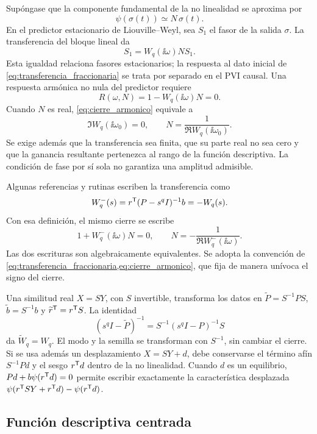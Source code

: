 Supóngase que la componente fundamental de la no linealidad se aproxima por
\[
\psi(\sigma(t))\simeq N\,\sigma(t).
\]
En el predictor estacionario de Liouville--Weyl, sea \(S_1\) el fasor de
la salida \(\sigma\). La transferencia del bloque lineal da
\[
S_1=W_q(\ii\omega)N S_1.
\]
Esta igualdad relaciona fasores estacionarios; la respuesta al dato inicial
de \cref{eq:transferencia_fraccionaria} se trata por separado en el PVI
causal. Una respuesta armónica no nula del predictor requiere
\begin{equation}
R(\omega,N)
=1-W_q(\ii\omega)N=0.
\label{eq:cierre_armonico}
\end{equation}
Cuando \(N\) es real, \cref{eq:cierre_armonico} equivale a
\begin{equation}
\Im W_q(\ii\omega_0)=0,\qquad
N=\frac{1}{\Re W_q(\ii\omega_0)}.
\label{eq:condiciones_fase_ganancia}
\end{equation}
Se exige además que la transferencia sea finita, que su parte real no sea
cero y que la ganancia resultante pertenezca al rango de la función
descriptiva. La condición de fase por sí sola no garantiza una amplitud
admisible.

Algunas referencias y rutinas escriben la transferencia como
\[
W_q^{-}(s)=r^{\mathsf T}(P-s^qI)^{-1}b=-W_q(s).
\]
Con esa definición, el mismo cierre se escribe
\[
1+W_q^{-}(\ii\omega)N=0,\qquad
N=-\frac{1}{\Re W_q^{-}(\ii\omega)}.
\]
Las dos escrituras son algebraicamente equivalentes. Se adopta la convención de
\cref{eq:transferencia_fraccionaria,eq:cierre_armonico}, que fija de manera
unívoca el signo del cierre.

Una similitud real \(X=SY\), con \(S\) invertible, transforma los datos
en \(\widetilde P=S^{-1}PS\), \(\widetilde b=S^{-1}b\) y
\(\widetilde r^{\mathsf T}=r^{\mathsf T}S\). La identidad
\[
 (s^qI-\widetilde P)^{-1}=S^{-1}(s^qI-P)^{-1}S
\]
da \(\widetilde W_q=W_q\). El modo y la semilla se transforman con
\(S^{-1}\), sin cambiar el cierre. Si se usa además un desplazamiento
\(X=SY+d\), debe conservarse el término afín \(S^{-1}Pd\) y el
sesgo \(r^{\mathsf T}d\) dentro de la no linealidad. Cuando \(d\) es un
equilibrio, \(Pd+b\psi(r^{\mathsf T}d)=0\) permite escribir exactamente
la característica desplazada
\(\psi(r^{\mathsf T}SY+r^{\mathsf T}d)-\psi(r^{\mathsf T}d)\).

\subsection{Función descriptiva centrada}

